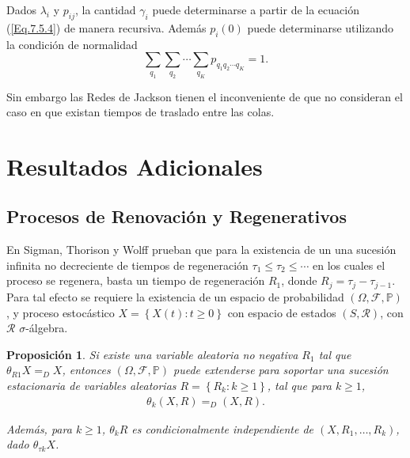 \documentclass{article}
\newtheorem{Prop}{Proposición}[section]
\newcommand{\prob}{\mathbb{P}}
\numberwithin{equation}{section}
\begin{document}
{Dados $\lambda_{i}$ y $p_{ij}$, la cantidad $\gamma_{i}$ puede determinarse a partir de la ecuaci\'on (\ref{Eq.7.5.4}) de manera recursiva. Adem\'as $p_{i}\left(0\right)$ puede determinarse utilizando la condici\'on de normalidad
\[\sum_{q_{1}}\sum_{q_{2}}\cdots\sum_{q_{K}}p_{q_{1}q_{2}\cdots q_{K}}=1.\]

Sin embargo las Redes de Jackson tienen el inconveniente de que no consideran el caso en que existan tiempos de traslado entre las colas. 



\section{Resultados Adicionales}


\subsection{Procesos de Renovaci\'on y Regenerativos}




En Sigman, Thorison y Wolff \cite{Sigman2} prueban que para la existencia de un una sucesi\'on infinita no decreciente de tiempos de regeneraci\'on $\tau_{1}\leq\tau_{2}\leq\cdots$ en los cuales el proceso se regenera, basta un tiempo de regeneraci\'on $R_{1}$, donde $R_{j}=\tau_{j}-\tau_{j-1}$. Para tal efecto se requiere la existencia de un espacio de probabilidad $\left(\Omega,\mathcal{F},\prob\right)$, y proceso estoc\'astico $\textit{X}=\left\{X\left(t\right):t\geq0\right\}$ con espacio de estados $\left(S,\mathcal{R}\right)$, con $\mathcal{R}$ $\sigma$-\'algebra.

\begin{Prop}
Si existe una variable aleatoria no negativa $R_{1}$ tal que $\theta_{R1}X=_{D}X$, entonces $\left(\Omega,\mathcal{F},\prob\right)$ puede extenderse para soportar una sucesi\'on estacionaria de variables aleatorias $R=\left\{R_{k}:k\geq1\right\}$, tal que para $k\geq1$,
\begin{eqnarray*}
\theta_{k}\left(X,R\right)=_{D}\left(X,R\right).
\end{eqnarray*}

Adem\'as, para $k\geq1$, $\theta_{k}R$ es condicionalmente independiente de $\left(X,R_{1},\ldots,R_{k}\right)$, dado $\theta_{\tau k}X$.


\end{Prop}}
\end{document}
